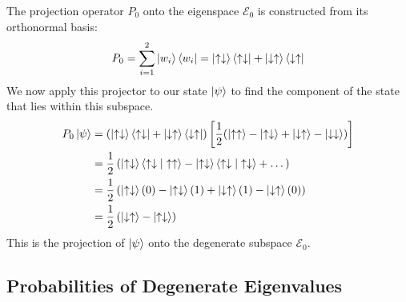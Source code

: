 \documentclass[11pt,a4paper]{article}
\begin{document}
The projection operator $P_0$ onto the eigenspace $\mathcal{E}_0$ is constructed from its orthonormal basis:
\begin{equation}
    P_0 = \sum_{i=1}^{2} \ket{w_i}\bra{w_i} = \ket{\uparrow\downarrow}\bra{\uparrow\downarrow} + \ket{\downarrow\uparrow}\bra{\downarrow\uparrow}
\end{equation}
We now apply this projector to our state $\ket{\psi}$ to find the component of the state that lies within this subspace.
\begin{equation}
    \begin{aligned}
    P_0 \ket{\psi} &= (\ket{\uparrow\downarrow}\bra{\uparrow\downarrow} + \ket{\downarrow\uparrow}\bra{\downarrow\uparrow}) \left[ \frac{1}{2} (\ket{\uparrow\uparrow} - \ket{\uparrow\downarrow} + \ket{\downarrow\uparrow} - \ket{\downarrow\downarrow}) \right] \nonumber \\
    &= \frac{1}{2} \left( \ket{\uparrow\downarrow}\braket{\uparrow\downarrow|\uparrow\uparrow} - \ket{\uparrow\downarrow}\braket{\uparrow\downarrow|\uparrow\downarrow} + \dots \right) \nonumber \\
    &= \frac{1}{2} \left( \ket{\uparrow\downarrow}(0) - \ket{\uparrow\downarrow}(1) + \ket{\downarrow\uparrow}(1) - \ket{\downarrow\uparrow}(0) \right) \nonumber \\
    &= \frac{1}{2} \left( \ket{\downarrow\uparrow} - \ket{\uparrow\downarrow} \right)
    \end{aligned}
\end{equation}
This is the projection of $\ket{\psi}$ onto the degenerate subspace $\mathcal{E}_0$.


\subsection{Probabilities of Degenerate Eigenvalues}
\end{document}
